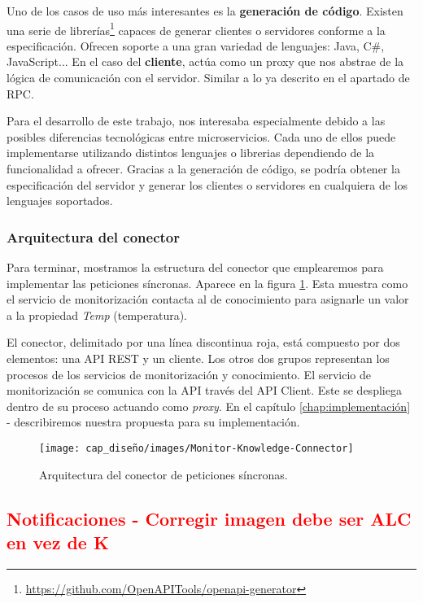 Uno de los casos de uso más interesantes es la \textbf{generación de código}. Existen una serie de librerías\footnote{\url{https://github.com/OpenAPITools/openapi-generator}} capaces de generar clientes o servidores conforme a la especificación. Ofrecen soporte a una gran variedad de lenguajes: Java, C\#, JavaScript... En el caso del \textbf{cliente}, actúa como un proxy que nos abstrae de la lógica de comunicación con el servidor. Similar a lo ya descrito en el apartado de RPC.

Para el desarrollo de este trabajo, nos interesaba especialmente debido a las posibles diferencias tecnológicas entre microservicios. Cada uno de ellos puede implementarse utilizando distintos lenguajes o librerias dependiendo de la funcionalidad a ofrecer. Gracias a la generación de código, se podría obtener la especificación del servidor y generar los clientes o servidores en cualquiera de los lenguajes soportados.

\subsubsection{Arquitectura del conector}

Para terminar, mostramos la estructura del conector que emplearemos para implementar las peticiones síncronas. Aparece en la figura \ref{fig:monitor-knowledge-connector-architecture}. Esta muestra como el servicio de monitorización contacta al de conocimiento para asignarle un valor a la propiedad \emph{Temp} (temperatura).

El conector, delimitado por una línea discontinua roja, está compuesto por dos elementos: una API REST y un cliente. Los otros dos grupos representan los procesos de los servicios de monitorización y conocimiento. El servicio de monitorización se comunica con la API través del API Client. Este se despliega dentro de su proceso actuando como \emph{proxy}. En el capítulo \ref{chap:implementación} -  describiremos nuestra propuesta para su implementación.

\begin{figure}[htb]
  \centering
  \texttt{[image: cap\_diseño/images/Monitor-Knowledge-Connector]}
  \caption{Arquitectura del conector de peticiones síncronas.}
  \label{fig:monitor-knowledge-connector-architecture}
\end{figure}

\subsection{\textcolor{red}{Notificaciones - Corregir imagen debe ser ALC en vez de K}}
\label{sec:notificaciones}

